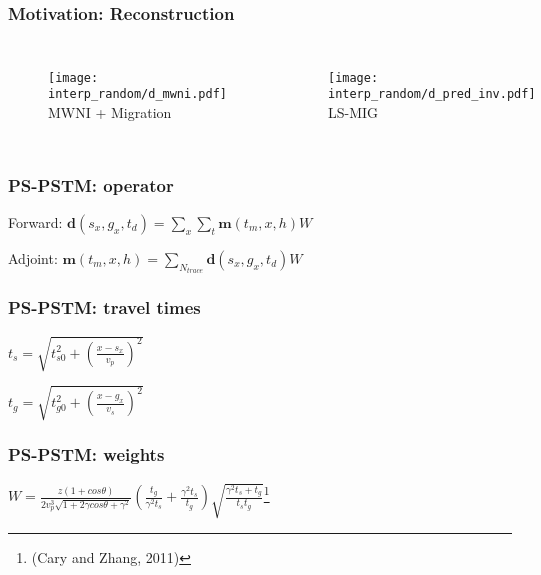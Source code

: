 \begin{frame}
\section[Motivation]{}
\frametitle{Motivation: Reconstruction}
\begin{columns}[c]
\column{2in} 
	\begin{figure} 
	\texttt{[image: interp\_random/d\_mwni.pdf]} \\ 
	\tiny MWNI + Migration
	\end{figure} 
\column{2in}
	\begin{figure} 
	\texttt{[image: interp\_random/d\_pred\_inv.pdf]} \\
	\tiny LS-MIG
	\end{figure}
\end{columns}
\end{frame}

\begin{frame}
\frametitle{PS-PSTM: operator}
\begin{center}
Forward:           
$
\mathbf{d}(s_x,g_x,t_d)=\sum\limits_{x}\sum\limits_{t}\mathbf{m}(t_m,x,h)W
$\\
\vspace{1cm}

Adjoint:           
$
\mathbf{m}(t_m,x,h)=\sum\limits_{N_{trace}}\mathbf{d}(s_x,g_x,t_d)W
$
\end{center}
\end{frame}

\begin{frame}
\frametitle{PS-PSTM: travel times}
\begin{center}
$
t_s = \sqrt{t_{s0}^2 + (\frac{x-s_x}{v_p})^2} 
$\\
\vspace{1cm}

$
t_g = \sqrt{t_{g0}^2 + (\frac{x-g_x}{v_s})^2 } 
$
\end{center}
\end{frame}

\begin{frame}
\begin{center}
\frametitle{PS-PSTM: weights}
$
W=\frac{z(1+cos\theta)}{2v_p^3\sqrt{1+2\gamma cos\theta + \gamma^2}} (\frac{t_g}{\gamma ^2 t_s} + \frac{\gamma^2t_s}{t_g}) \sqrt{\frac{\gamma^2t_s + t_g}{t_st_g}}$\let\thefootnote\relax\footnote{(Cary and Zhang, 2011)}
\end{center}
\end{frame}

